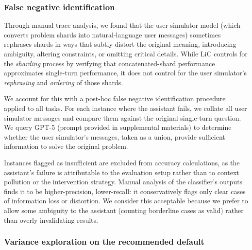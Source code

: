 \documentclass{article}
\begin{document}
\subsubsection{False negative identification}
\label{app:false-neg}

Through manual trace analysis, we found that the user simulator model (which converts problem shards into natural-language user messages) sometimes rephrases shards in ways that subtly distort the original meaning, introducing ambiguity, altering constraints, or omitting critical details. While LiC controls for the \emph{sharding} process by verifying that concatenated-shard performance approximates single-turn performance, it does not control for the user simulator's \emph{rephrasing} and \emph{ordering} of those shards.

We account for this with a post-hoc false negative identification procedure applied to all tasks. For each instance where the assistant fails, we collate all user simulator messages and compare them against the original single-turn question. We query GPT-5 (prompt provided in supplemental materials) to determine whether the user simulator's messages, taken as a union, provide sufficient information to solve the original problem.

Instances flagged as insufficient are excluded from accuracy calculations, as the assistant's failure is attributable to the evaluation setup rather than to context pollution or the intervention strategy. Manual analysis of the classifier's outputs finds it to be higher-precision, lower-recall: it conservatively flags only clear cases of information loss or distortion. We consider this acceptable because we prefer to allow some ambiguity to the assistant (counting borderline cases as valid) rather than overly invalidating results.

\subsubsection{Variance exploration on the recommended default}
\label{app:variance}
\end{document}
